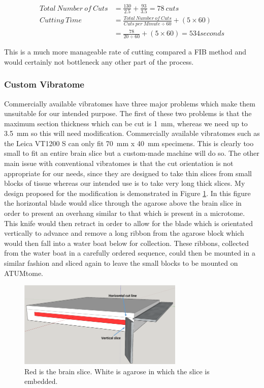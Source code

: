 \documentclass[a4paper, 11pt]{article}
\numberwithin{equation}{section}
\begin{document}
	
	\begin{align}
	Total\ Number\ of\ Cuts &= \frac{130}{2.5} + \frac{93}{3.5} = 78\ cuts \nonumber \\
	Cutting\ Time &= \frac{Total\ Number\ of\ Cuts}{Cuts\ per\ Minute \div 60} + (5\times60) \nonumber \\
	&= \frac{78}{20 \div 60} + (5\times60) = 534seconds		
	\end{align}
	
	This is a much more manageable rate of cutting compared a FIB method and would certainly not bottleneck any other part of the process. 
	
	\subsubsection{Custom Vibratome}
	\label{sectioning_smaller_vibratome}
	
	Commercially available vibratomes have three major problems which make them unsuitable for our intended purpose. The first of these two problems is that the maximum section thickness which can be cut is \SI{1}{\milli\meter}, whereas we need up to \SI{3.5}{\milli\meter} so this will need modification. Commercially available vibratomes such as the Leica VT1200 S can only fit \SI{70}{\milli\meter} x \SI{40}{\milli\meter} specimens. This is clearly too small to fit an entire brain slice but a custom-made machine will do so. The other main issue with conventional vibratomes is that the cut orientation is not appropriate for our needs, since they are designed to take thin slices from small blocks of tissue whereas our intended use is to take very long thick slices. My design proposed for the modification is demonstrated in Figure \ref{custom_vibratome}. In this figure the horizontal blade would slice through the agarose above the brain slice in order to present an overhang similar to that which is present in a microtome. This knife would then retract in order to allow for the blade which is orientated vertically to advance and remove a long ribbon from the agarose block which would then fall into a water boat below for collection. These ribbons, collected from the water boat in a carefully ordered sequence, could then be mounted in a similar fashion and sliced again to leave the small blocks to be mounted on ATUMtome.
	
	\begin{figure}
		\centering
		\includegraphics[width=0.7\textwidth]{custom_vibratome}
		\caption{Red is the brain slice. White is agarose in which the slice is embedded.}
		\label{custom_vibratome}
	\end{figure} 
	
\end{document}
